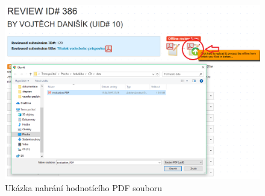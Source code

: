 \begin{figure}[h!]
\centering
\includegraphics[width=12cm]{img/upload}
\caption{Ukázka nahrání hodnotícího PDF souboru}
\label{fig:upload}
\end{figure}


 